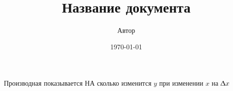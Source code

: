 \documentclass[a4paper,12pt]{article}
\title{Название документа}
\author{Автор}
\date{\today}
\begin{document}
\maketitle

Производная показывается НА сколько изменится $y$ при изменении $x$ на $\Updelta x$
\end{document}
